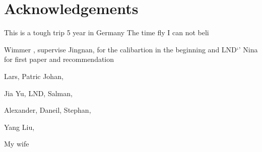 \chapter*{Acknowledgements}

This is a tough trip 
5 year in Germany
The time fly 
I can not beli

Wimmer , supervise
Jingnan, for the calibartion in the beginning and LND`'
Nina for first paper and recommendation


Lars, Patric
Johan, 

Jia Yu, LND, Salman, 

Alexander, Daneil, Stephan, 

Yang Liu, 

My wife 







